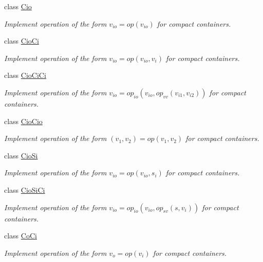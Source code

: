\begin{DoxyCompactItemize}
\item 
class \hyperlink{classvct_dynamic_compact_loop_engines_1_1_cio}{Cio}
\begin{DoxyCompactList}\small\item\em Implement operation of the form $v_{io} = op(v_{io})$ for compact containers. \end{DoxyCompactList}\item 
class \hyperlink{classvct_dynamic_compact_loop_engines_1_1_cio_ci}{Cio\+Ci}
\begin{DoxyCompactList}\small\item\em Implement operation of the form $v_{io} = op(v_{io}, v_i)$ for compact containers. \end{DoxyCompactList}\item 
class \hyperlink{classvct_dynamic_compact_loop_engines_1_1_cio_ci_ci}{Cio\+Ci\+Ci}
\begin{DoxyCompactList}\small\item\em Implement operation of the form $v_{io} = op_{io}(v_{io}, op_{vv}(v_{i1}, v_{i2}))$ for compact containers. \end{DoxyCompactList}\item 
class \hyperlink{classvct_dynamic_compact_loop_engines_1_1_cio_cio}{Cio\+Cio}
\begin{DoxyCompactList}\small\item\em Implement operation of the form $(v_{1}, v_{2}) = op(v_{1}, v_{2})$ for compact containers. \end{DoxyCompactList}\item 
class \hyperlink{classvct_dynamic_compact_loop_engines_1_1_cio_si}{Cio\+Si}
\begin{DoxyCompactList}\small\item\em Implement operation of the form $ v_{io} = op(v_{io}, s_i)$ for compact containers. \end{DoxyCompactList}\item 
class \hyperlink{classvct_dynamic_compact_loop_engines_1_1_cio_si_ci}{Cio\+Si\+Ci}
\begin{DoxyCompactList}\small\item\em Implement operation of the form $v_{io} = op_{io}(v_{io}, op_{sv}(s, v_i))$ for compact containers. \end{DoxyCompactList}\item 
class \hyperlink{classvct_dynamic_compact_loop_engines_1_1_co_ci}{Co\+Ci}
\begin{DoxyCompactList}\small\item\em Implement operation of the form $v_o = op(v_i)$ for compact containers. \end{DoxyCompactList}\item 

\end{DoxyCompactItemize}
